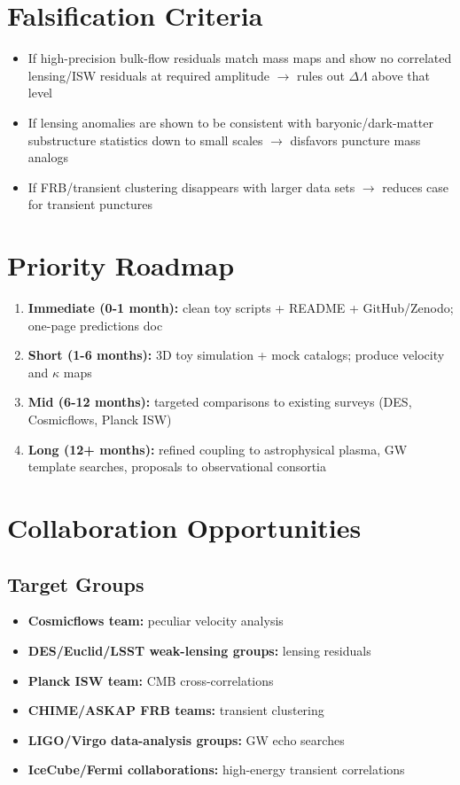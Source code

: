 \documentclass[11pt,a4paper]{article}
\begin{document}
\section{Falsification Criteria}

\begin{itemize}
\item If high-precision bulk-flow residuals match mass maps and show no correlated lensing/ISW residuals at required amplitude $\rightarrow$ rules out $\Delta\Lambda$ above that level
\item If lensing anomalies are shown to be consistent with baryonic/dark-matter substructure statistics down to small scales $\rightarrow$ disfavors puncture mass analogs
\item If FRB/transient clustering disappears with larger data sets $\rightarrow$ reduces case for transient punctures
\end{itemize}

\section{Priority Roadmap}

\begin{enumerate}
\item \textbf{Immediate (0-1 month):} clean toy scripts + README + GitHub/Zenodo; one-page predictions doc
\item \textbf{Short (1-6 months):} 3D toy simulation + mock catalogs; produce velocity and $\kappa$ maps
\item \textbf{Mid (6-12 months):} targeted comparisons to existing surveys (DES, Cosmicflows, Planck ISW)
\item \textbf{Long (12+ months):} refined coupling to astrophysical plasma, GW template searches, proposals to observational consortia
\end{enumerate}

\section{Collaboration Opportunities}

\subsection{Target Groups}

\begin{itemize}
\item \textbf{Cosmicflows team:} peculiar velocity analysis
\item \textbf{DES/Euclid/LSST weak-lensing groups:} lensing residuals
\item \textbf{Planck ISW team:} CMB cross-correlations
\item \textbf{CHIME/ASKAP FRB teams:} transient clustering
\item \textbf{LIGO/Virgo data-analysis groups:} GW echo searches
\item \textbf{IceCube/Fermi collaborations:} high-energy transient correlations
\end{itemize}
\end{document}
